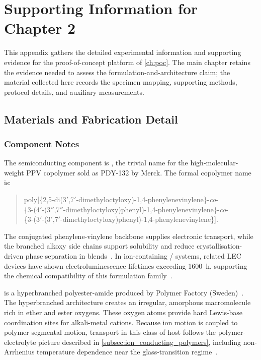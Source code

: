 
\chapter{Supporting Information for Chapter 2}\label{app:ch2_si}

This appendix gathers the detailed experimental information and supporting evidence for the proof-of-concept platform of \cref{ch:poc}. The main chapter retains the evidence needed to assess the formulation-and-architecture claim; the material collected here records the specimen mapping, supporting methods, protocol details, and auxiliary measurements.

\section{Materials and Fabrication Detail}\label{app:ch2_materials_fabrication}

\subsection{Component Notes}

The semiconducting component is \SY{}, the trivial name for the high-molecular-weight PPV copolymer sold as PDY-132 by Merck. The formal copolymer name is:
\begin{quote}
  \small\raggedright
  poly[\{2,5-di(3$'$,7$'$-dimethyloctyloxy)-1,4-phenylenevinylene\}-\textit{co}-{}\\
  \{3-(4$'$-(3$''$,7$''$-dimethyloctyloxy)phenyl)-1,4-phenylenevinylene\}-\textit{co}-{}\\
  \{3-(3$'$-(3$'$,7$'$-dimethyloctyloxy)phenyl)-1,4-phenylenevinylene\}].
\end{quote}
The conjugated phenylene-vinylene backbone supplies electronic transport, while the branched alkoxy side chains support solubility and reduce crystallisation-driven phase separation in blends~\cite{PradoSocorro2022,Zhang2015}. In ion-containing \SY{}/\Hybrane{} systems, related LEC devices have shown electroluminescence lifetimes exceeding \SI{1600}{\hour}, supporting the chemical compatibility of this formulation family~\cite{Mardegan2021}.

\Hybrane{} is a hyperbranched polyester-amide produced by Polymer Factory (Sweden)~\cite{Froehling2004}. The hyperbranched architecture creates an irregular, amorphous macromolecule rich in ether and ester oxygens. These oxygen atoms provide hard Lewis-base coordination sites for alkali-metal cations. Because ion motion is coupled to polymer segmental motion, transport in this class of host follows the polymer-electrolyte picture described in \cref{subsec:ion_conducting_polymers}, including non-Arrhenius temperature dependence near the glass-transition regime~\cite{Armand1989,WilliamsLandelFerry1955}.

